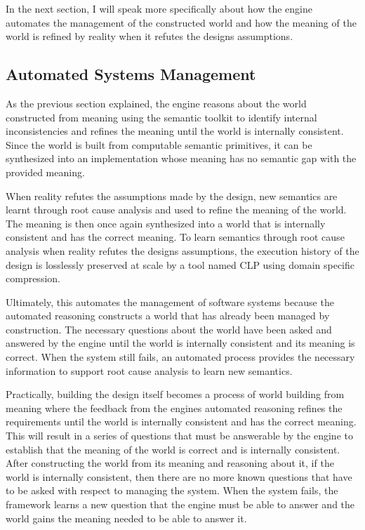 In the next section, I will speak more specifically about how the engine automates the management of the constructed world and how the meaning of the world is refined by reality when it refutes the designs assumptions. 

\subsection{Automated Systems Management}

As the previous section explained, the engine reasons about the world constructed from meaning using the semantic toolkit to identify internal inconsistencies and refines the meaning until the world is internally consistent. Since the world is built from computable semantic primitives, it can be synthesized into an implementation whose meaning has no semantic gap with the provided meaning.

When reality refutes the assumptions made by the design, new semantics are learnt through root cause analysis and used to refine the meaning of the world. The meaning is then once again synthesized into a world that is internally consistent and has the correct meaning. To learn semantics through root cause analysis when reality refutes the designs assumptions, the execution history of the design is losslessly preserved at scale by a tool named CLP using domain specific compression.

Ultimately, this automates the management of software systems because the automated reasoning constructs a world that has already been managed by construction. The necessary questions about the world have been asked and answered by the engine until the world is internally consistent and its meaning is correct. When the system still fails, an automated process provides the necessary information to support root cause analysis to learn new semantics.

Practically, building the design itself becomes a process of world building from meaning where the feedback from the engines automated reasoning refines the requirements until the world is internally consistent and has the correct meaning. This will result in a series of questions that must be answerable by the engine to establish that the meaning of the world is correct and is internally consistent. After constructing the world from its meaning and reasoning about it, if the world is internally consistent, then there are no more known questions that have to be asked with respect to managing the system. When the system fails, the framework learns a new question that the engine must be able to answer and the world gains the meaning needed to be able to answer it.

